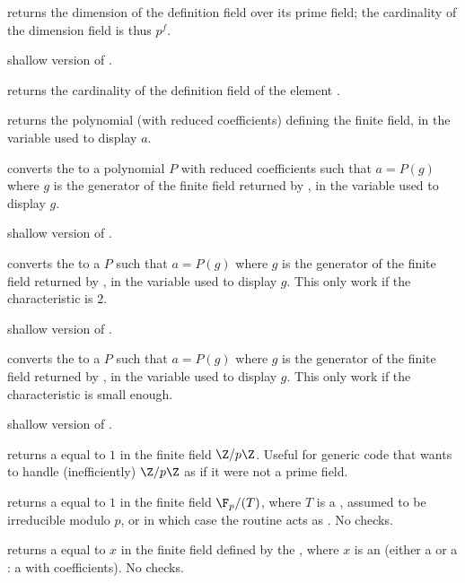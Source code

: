  returns the dimension of the definition field over
its prime field; the cardinality of the dimension field is thus $p^f$.

 shallow version of .

 returns the cardinality of the definition field of the
 element .

 returns the polynomial (with reduced 
coefficients) defining the finite field, in the variable used to display $a$.

 converts the   to a polynomial
$P$ with reduced  coefficients such that $a=P(g)$ where $g$ is the
generator of the finite field returned by , in the variable used to
display $g$.

 shallow version of .

 converts the   to a 
$P$ such that $a=P(g)$ where $g$ is the generator of the finite field returned
by , in the variable used to display $g$. This only work if the
characteristic is $2$.

 shallow version of .

 converts the   to a 
$P$ such that $a=P(g)$ where $g$ is the generator of the finite field returned
by , in the variable used to display $g$. This only work if the
characteristic is small enough.

 shallow version of .

 returns a  equal to $1$ in the
finite field $\Z/p\Z$. Useful for generic code that wants to handle
(inefficiently) $\Z/p\Z$ as if it were not a prime field.

 returns a  equal to $1$ in the
finite field $\F_p/(T)$, where $T$ is a , assumed to be irreducible
modulo $p$, or  in which case the routine acts as .
No checks.

 returns a  equal to $x$
in the finite field defined by the  , where
$x$ is an  (either a  or a : a  with
 coefficients). No checks.

